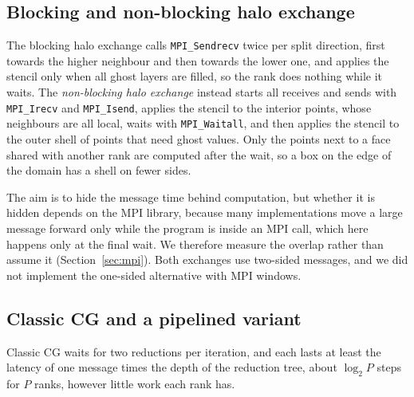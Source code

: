\documentclass[10pt,a4paper]{article}
\makeatletter
\newcommand{\code}[1]{\texttt{#1}}
\newcommand{\term}[1]{\emph{#1}}%
\newcommand{\val}[1]{\ifcsname pv@#1\endcsname\csname pv@#1\endcsname\else\errmessage{undefined generated value #1}\fi}
\makeatother
\begin{document}
\begin{table}[H]\centering\footnotesize
{}
\caption{Halo per exchange for the strong-scaling grids (2D $n=\val{strong.n2}$, 3D $n=\val{strong.n3}$), for the rank
that sends the most halo values, computed from the program's decomposition. For every recorded run the process grid and
this halo count equal what the run itself recorded.}
\label{tab:geometry}
\end{table}

\subsection{Blocking and non-blocking halo exchange}\label{sec:halo}
The blocking halo exchange calls \code{MPI\_Sendrecv} twice per split direction, first towards the higher neighbour and
then towards the lower one, and applies the stencil only when all ghost layers are filled, so the rank does nothing
while it waits. The \term{non-blocking halo exchange} instead starts all receives and sends with \code{MPI\_Irecv} and
\code{MPI\_Isend}, applies the stencil to the interior points, whose neighbours are all local, waits with
\code{MPI\_Waitall}, and then applies the stencil to the outer shell of points that need ghost values. Only the points
next to a face shared with another rank are computed after the wait, so a box on the edge of the domain has a shell on
fewer sides.

The aim is to hide the
message time behind computation, but whether it is hidden depends on the MPI library, because many implementations move
a large message forward only while the program is inside an MPI call, which here happens only at the final wait. We
therefore measure the overlap rather than assume it (Section~\ref{sec:mpi}). Both exchanges use two-sided messages, and
we did not implement the one-sided alternative with MPI windows.

\subsection{Classic CG and a pipelined variant}
Classic CG waits for two reductions per iteration, and each lasts at least the latency of one message times the depth
of the reduction tree, about $\log_2 P$ steps for $P$ ranks, however little work each rank has.
\end{document}
